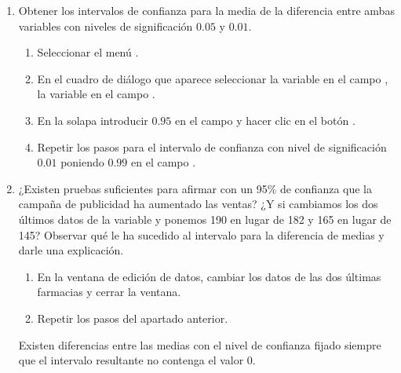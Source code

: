 \begin{enumerate}[leftmargin=*]
\begin{enumerate}
\item Obtener los intervalos de confianza para la media de la diferencia entre ambas variables con niveles de significación $0.05$ y $0.01$.
\begin{indicacion}{
\begin{enumerate}
\item Seleccionar el menú .
\item En el cuadro de diálogo que aparece seleccionar la variable  en el campo , la variable
 en el campo .
\item En la solapa  introducir $0.95$ en el campo  y hacer clic en el botón
.
\item Repetir los pasos para el intervalo de confianza con nivel de significación $0.01$ poniendo $0.99$ en el campo .
\end{enumerate}
}
\end{indicacion}

\item ¿Existen pruebas suficientes para afirmar con un 95\% de confianza que la campaña de publicidad ha aumentado las
ventas? ¿Y si cambiamos los dos últimos datos de la variable  y ponemos 190 en lugar de 182 y 165 en
lugar de 145? Observar qué le ha sucedido al intervalo para la diferencia de medias y darle una explicación.
\begin{indicacion}{
\begin{enumerate}
\item En la ventana de edición de datos, cambiar los datos de las dos últimas farmacias y cerrar la ventana.
\item Repetir los pasos del apartado anterior.
\end{enumerate}
Existen diferencias entre las medias con el nivel de confianza fijado siempre que el intervalo resultante no contenga el valor 0.
}
\end{indicacion}
\end{enumerate}



\end{enumerate}
